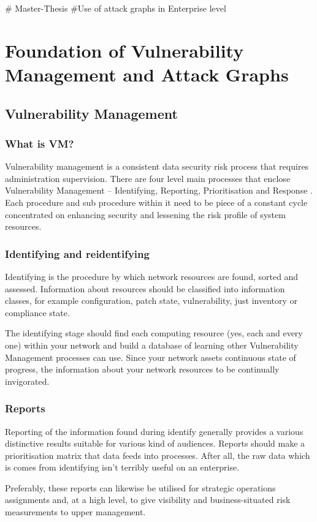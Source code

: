 # Master-Thesis
#Use of attack graphs in Enterprise level
\chapter{Foundation of Vulnerability Management and Attack Graphs}
\label{ch2}
\section{Vulnerability Management}

\subsection{What is VM?}
Vulnerability management is a consistent data security risk process that requires administration supervision. There are four level main processes that enclose Vulnerability Management -- Identifying, Reporting, Prioritisation and Response \cite{whatvm}.
Each procedure and sub procedure within it need to be piece of a constant cycle concentrated on enhancing security and lessening the risk profile of system resources.

\subsection*{Identifying and reidentifying}
Identifying is the procedure by which network resources are found, sorted and assessed. Information about resources should be classified into information classes, for example configuration, patch state, vulnerability, just inventory or compliance state.

The identifying stage should find each computing resource (yes, each and every one) within your network and build a database of learning other Vulnerability Management processes can use. Since your network assets continuous state of progress, the information about your network resources to be continually invigorated.

\subsection*{Reports}
Reporting of the information found during identify generally provides a various distinctive results suitable for various kind of audiences. Reports should make a prioritisation matrix that data feeds into processes. After all, the raw data which is comes from identifying isn't terribly useful on an enterprise. 

Preferably, these reports can likewise be utilised for strategic operations assignments and,  at a high level, to give visibility and business-situated risk measurements to upper management.

